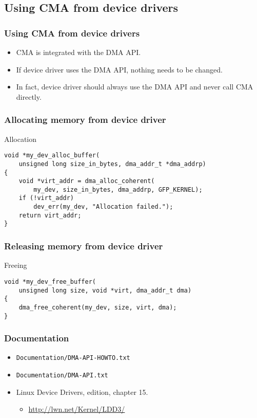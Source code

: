 \subsection{Using CMA from device drivers}

\begin{frame}
  \frametitle{Using CMA from device drivers}

  \begin{itemize}
  \item CMA is integrated with the DMA API.
  \item If device driver uses the DMA API, nothing needs to be changed.
  \item In fact, device driver should always use the DMA API and never
    call CMA directly.
  \end{itemize}
\end{frame}

\begin{frame}[fragile]
  \frametitle{Allocating memory from device driver}

  \begin{block}{Allocation}
\begin{lstlisting}
void *my_dev_alloc_buffer(
    unsigned long size_in_bytes, dma_addr_t *dma_addrp)
{
    void *virt_addr = dma_alloc_coherent(
        my_dev, size_in_bytes, dma_addrp, GFP_KERNEL);
    if (!virt_addr)
        dev_err(my_dev, "Allocation failed.");
    return virt_addr;
}
\end{lstlisting}
  \end{block}

\end{frame}

\begin{frame}[fragile]
  \frametitle{Releasing memory from device driver}

  \begin{block}{Freeing}
\begin{lstlisting}
void *my_dev_free_buffer(
    unsigned long size, void *virt, dma_addr_t dma)
{
    dma_free_coherent(my_dev, size, virt, dma);
}
\end{lstlisting}
  \end{block}
\end{frame}

\begin{frame}
  \frametitle{Documentation}

  \begin{itemize}
  \item \lstinline|Documentation/DMA-API-HOWTO.txt|
  \item \lstinline|Documentation/DMA-API.txt|
  \item Linux Device Drivers,  edition, chapter 15.
    \begin{itemize}
    \item \url{http://lwn.net/Kernel/LDD3/}
    \end{itemize}
  \end{itemize}
\end{frame}
